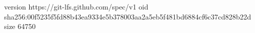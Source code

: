 version https://git-lfs.github.com/spec/v1
oid sha256:00f5235f5fd88b43ea9334e5b378003aa2a5eb5f481bd6884cf6c37cd828b22d
size 64750
